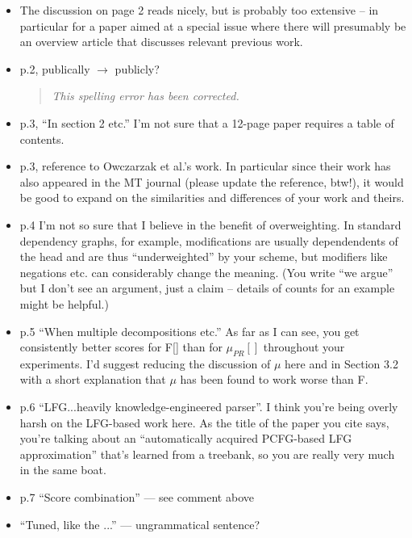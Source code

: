 \documentclass[letterpaper,12pt]{article}
\newenvironment{response}
{\begin{quotation} \it}
  {\end{quotation}}
\begin{document}
\begin{itemize}
\item The discussion on page 2 reads nicely, but is probably too
  extensive -- in particular for a paper aimed at a special issue
  where there will presumably be an overview article that discusses
  relevant previous work.

\item  p.2, publically $\to$ publicly?
  \begin{response}
    This spelling error has been corrected.
  \end{response}

\item  p.3, ``In section 2 etc.'' I'm not sure that a 12-page paper
  requires a table of contents.

\item  p.3, reference to Owczarzak et al.'s work. In particular since
  their work has also appeared in the MT journal (please update the
  reference, btw!), it would be good to expand on the similarities and
  differences of your work and theirs.

\item p.4 I'm not so sure that I believe in the benefit of overweighting.
  In standard dependency graphs, for example, modifications are
  usually dependendents of the head and are thus ``underweighted'' by
  your scheme, but modifiers like negations etc. can considerably
  change the meaning.  (You write ``we argue'' but I don't see an
  argument, just a claim -- details of counts for an example might be
  helpful.)

\item p.5 ``When multiple decompositions etc.'' As far as I can see, you
  get consistently better scores for F[] than for $\mu_{PR}[]$
  throughout your experiments.  I'd suggest reducing the discussion of
  $\mu$ here and in Section 3.2 with a short explanation that $\mu$
  has been found to work worse than F.

\item  p.6 ``LFG...heavily knowledge-engineered parser''. I think you're
  being overly harsh on the LFG-based work here. As the title of the
  paper you cite says, you're talking about an ``automatically acquired
  PCFG-based LFG approximation'' that's learned from a treebank, so you
  are really very much in the same boat.

\item p.7 ``Score combination'' --- see comment above 

\item ``Tuned, like the ...''  --- ungrammatical sentence?


\end{itemize}
\end{document}
